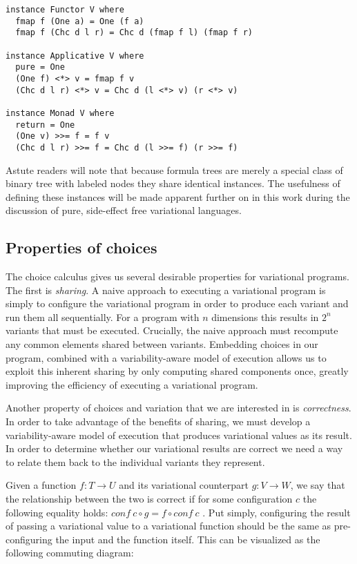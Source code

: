\documentclass[letterpaper,10pt,onecolumn]{article}
\begin{document}
\begin{lstlisting}
instance Functor V where
  fmap f (One a) = One (f a)
  fmap f (Chc d l r) = Chc d (fmap f l) (fmap f r)
  
instance Applicative V where
  pure = One
  (One f) <*> v = fmap f v
  (Chc d l r) <*> v = Chc d (l <*> v) (r <*> v)
  
instance Monad V where
  return = One
  (One v) >>= f = f v
  (Chc d l r) >>= f = Chc d (l >>= f) (r >>= f)
\end{lstlisting}

Astute readers will note that because formula trees are merely a special class of binary tree with
labeled nodes they share identical instances. The usefulness of defining these instances will be made
apparent further on in this work during the discussion of pure, side-effect free variational languages.

\subsection{Properties of choices}

The choice calculus gives us several desirable properties for variational programs.
The first is \emph{sharing}. A naive approach to executing a variational program is simply to
configure the variational program in order to produce each variant and run them all sequentially.
For a program with $n$ dimensions this results in $2^n$ variants that must be executed. Crucially,
the naive approach must recompute any common elements shared between variants. Embedding
choices in our program, combined with a variability-aware model of execution allows us to exploit this
inherent sharing by only computing shared components once, greatly improving the efficiency of
executing a variational program.

Another property of choices and variation that we are interested in is \emph{correctness}. In order
to take advantage of the benefits of sharing, we must develop a variability-aware model of execution
that produces variational values as its result. In order to determine whether our variational results
are correct we need a way to relate them back to the individual variants they represent.

Given a function $f : T \rightarrow U$ and its variational counterpart $g : V \rightarrow W$, we say that
the relationship between the two is correct if for some configuration $c$ the following equality holds:
$\mathit{conf}\ c \circ g = f \circ \mathit{conf}\ c$ \cite{hubbard2016formula}. Put simply, configuring the result
of passing a variational value to a variational function should be the same as pre-configuring the input
and the function itself. This can be visualized as the following commuting diagram:
\end{document}
